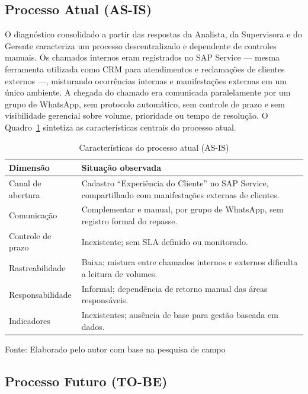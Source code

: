 \subsection{Processo Atual (AS-IS)}

O diagnóstico consolidado a partir das respostas da Analista,
da Supervisora e do Gerente caracteriza um processo
descentralizado e dependente de controles manuais. Os
chamados internos eram registrados no SAP Service --- mesma
ferramenta utilizada como CRM para atendimentos e reclamações
de clientes externos ---, misturando ocorrências internas e
manifestações externas em um único ambiente. A chegada do
chamado era comunicada paralelamente por um grupo de
WhatsApp, sem protocolo automático, sem controle de prazo e
sem visibilidade gerencial sobre volume, prioridade ou tempo
de resolução. O Quadro~\ref{quadro:as-is} sintetiza as
características centrais do processo atual.

\begin{table}[H]
\caption{Características do processo atual (AS-IS)}
\label{quadro:as-is}
\centering
\begin{tabular}{p{3.6cm} p{8.2cm}}
\hline
\textbf{Dimensão} & \textbf{Situação observada} \\
\hline
Canal de abertura & Cadastro ``Experiência do Cliente'' no
SAP Service, compartilhado com manifestações externas de
clientes. \\
\hline
Comunicação & Complementar e manual, por grupo de WhatsApp,
sem registro formal do repasse. \\
\hline
Controle de prazo & Inexistente; sem SLA definido ou
monitorado. \\
\hline
Rastreabilidade & Baixa; mistura entre chamados internos e
externos dificulta a leitura de volumes. \\
\hline
Responsabilidade & Informal; dependência de retorno manual
das áreas responsáveis. \\
\hline
Indicadores & Inexistentes; ausência de base para gestão
baseada em dados. \\
\hline
\end{tabular}
\raggedright
\par
{\fontsize{10}{12}\selectfont Fonte: Elaborado pelo autor com
base na pesquisa de campo}
\end{table}

\subsection{Processo Futuro (TO-BE)}

